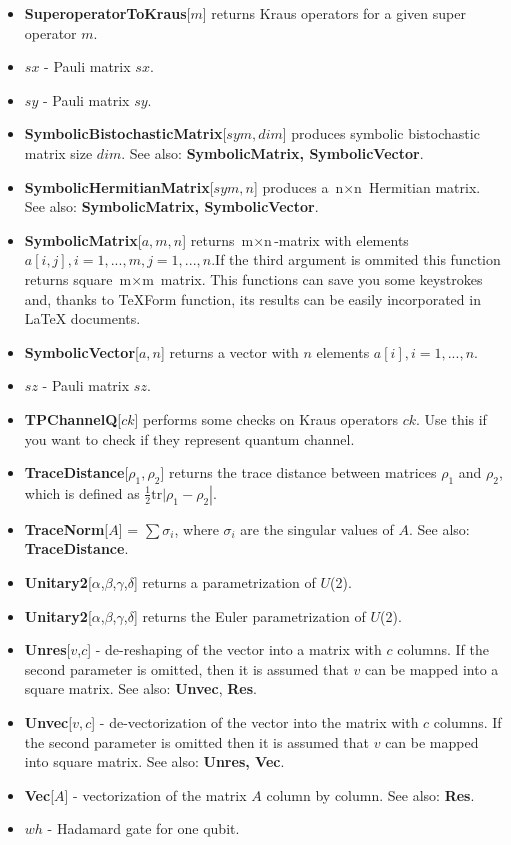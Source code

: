 \documentclass[a4paper,10pt]{scrartcl}
\begin{document}
\begin{itemize}
\item  \textbf{SuperoperatorToKraus}[$m$] returns Kraus operators for a given super operator $m$.
\item  $sx$ - Pauli matrix $sx$.
\item  $sy$ - Pauli matrix $sy$.
\item  \textbf{SymbolicBistochasticMatrix}[$sym, dim$] produces symbolic bistochastic matrix size $dim$. See also: \textbf{SymbolicMatrix, SymbolicVector}.
\item  \textbf{SymbolicHermitianMatrix}[$sym,n$] produces a $\text{n$\times $n}$ Hermitian matrix. See also: \textbf{SymbolicMatrix, SymbolicVector}.
\item  \textbf{SymbolicMatrix}[$a,m,n$] returns $\text{m$\times $n}$-matrix with elements $a[i,j], i=1,...,m, j=1,...,n$.If the third argument is ommited this function returns square $\text{m$\times $m}$ matrix. This functions can save you some keystrokes and, thanks to TeXForm function, its results can be easily incorporated in LaTeX documents.
\item  \textbf{SymbolicVector}[$a,n$] returns a vector with $n$ elements $a[i],i=1,...,n$.
\item  $sz$ - Pauli matrix $sz$.
\item  \textbf{TPChannelQ}[$ck$] performs some checks on Kraus operators $ck$. Use this if you want to check if they represent quantum channel.
\item  \textbf{TraceDistance}[$\rho _1,\rho _2$] returns the trace distance between matrices $\rho _1$ and $\rho _2$, which is defined as $\left.\frac{1}{2}\text{tr$|$}\rho _1-\rho _2\right|$.
\item  \textbf{TraceNorm}[$A$] = $\sum \sigma _i$, where $\sigma _i$ are the singular values of $A$. See also: \textbf{TraceDistance}.
\item  \textbf{Unitary2}[$\alpha$,$\beta$,$\gamma$,$\delta$] returns a parametrization of $U$(2).
\item  \textbf{Unitary2}[$\alpha$,$\beta$,$\gamma$,$\delta$] returns the Euler parametrization of $U$(2).
\item  \textbf{Unres}[$v$,$c$] - de-reshaping of the vector into a matrix with $c$ columns. If the second parameter is omitted, then it is assumed that $v$ can be mapped into a square matrix. See also: \textbf{Unvec}, \textbf{Res}.
\item  \textbf{Unvec}[$v,c$] - de-vectorization of the vector into the matrix with $c$ columns. If the second parameter is omitted then it is assumed that $v$ can be mapped into square matrix. See also: \textbf{Unres, Vec}.
\item  \textbf{Vec}[$A$] - vectorization of the matrix $A$ column by column. See also: \textbf{Res}.
\item  $wh$ - Hadamard gate for one qubit.
\end{itemize} 
\end{document}
